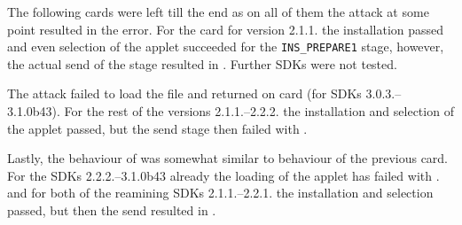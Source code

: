        The following cards were left till the end as on all of them the attack at some point resulted in the \scardenottransacted error. For the card \Fcard for version 2.1.1. the installation passed and even selection of the applet succeeded for the \texttt{INS_PREPARE1} stage, however, the actual send of the stage resulted in \scardenottransacted. Further SDKs were not tested.

        The attack failed to load the \transactionconfusioncap file and returned \shortswwrongdata on card \Hcard (for SDKs 3.0.3.--3.1.0b43). For the rest of the versions 2.1.1.--2.2.2. the installation and selection of the applet passed, but the send stage then failed with \scardenottransacted.

        Lastly, the behaviour of \Inewcard was somewhat similar to behaviour of the previous card. For the SDKs 2.2.2.--3.1.0b43 already the loading of the applet has failed with \shortswconditionsnotsatisfied. and for both of the reamining SDKs 2.1.1.--2.2.1. the installation and selection passed, but then the send resulted in \scardenottransacted.






